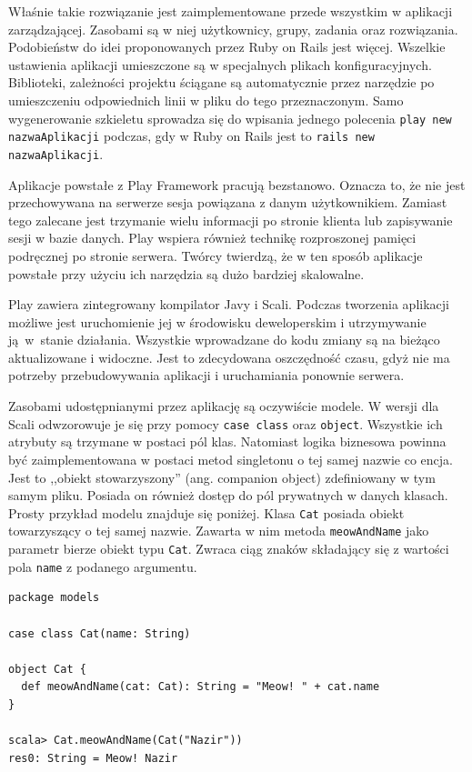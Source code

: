 \documentclass[wimgr]{xmgr}
\begin{document}
Właśnie takie rozwiązanie jest zaimplementowane przede wszystkim w aplikacji zarządzającej. Zasobami są w niej użytkownicy, grupy, zadania oraz rozwiązania. Podobieństw do idei proponowanych przez Ruby on Rails jest więcej. Wszelkie ustawienia aplikacji umieszczone są w specjalnych plikach konfiguracyjnych. Biblioteki, zależności projektu ściągane są automatycznie przez narzędzie po umieszczeniu odpowiednich linii w pliku do tego przeznaczonym. Samo wygenerowanie szkieletu sprowadza się do wpisania jednego polecenia \texttt{play new nazwaAplikacji} podczas, gdy w Ruby on Rails jest to \texttt{rails new nazwaAplikacji}.

Aplikacje powstałe z Play Framework pracują bezstanowo. Oznacza to, że nie jest przechowywana na serwerze sesja powiązana z danym użytkownikiem. Zamiast tego zalecane jest trzymanie wielu informacji po stronie klienta lub zapisywanie sesji w bazie danych. Play wspiera również technikę rozproszonej pamięci podręcznej po stronie serwera. Twórcy twierdzą, że w ten sposób aplikacje powstałe przy użyciu ich narzędzia są dużo bardziej skalowalne.

Play zawiera zintegrowany kompilator Javy i Scali. Podczas tworzenia aplikacji możliwe jest uruchomienie jej w środowisku deweloperskim i utrzymywanie ją~w~stanie działania. Wszystkie wprowadzane do kodu zmiany są na bieżąco aktualizowane i widoczne. Jest to zdecydowana oszczędność czasu, gdyż nie ma potrzeby przebudowywania aplikacji i uruchamiania ponownie serwera. 

Zasobami udostępnianymi przez aplikację są oczywiście modele. W wersji dla Scali odwzorowuje je się przy pomocy \texttt{case class} oraz \texttt{object}. Wszystkie ich atrybuty są trzymane w postaci pól klas. Natomiast logika biznesowa powinna być zaimplementowana w postaci metod singletonu o tej samej nazwie co encja. Jest to ,,obiekt stowarzyszony'' (ang. companion object) zdefiniowany w tym samym pliku. Posiada on również dostęp do pól prywatnych w danych klasach. Prosty przykład modelu znajduje się poniżej. Klasa \texttt{Cat} posiada obiekt towarzyszący o tej samej nazwie. Zawarta w nim metoda \texttt{meowAndName} jako parametr bierze obiekt typu \texttt{Cat}. Zwraca ciąg znaków składający się z wartości pola \texttt{name} z podanego argumentu.

\begin{verbatim}
package models

case class Cat(name: String)

object Cat {
  def meowAndName(cat: Cat): String = "Meow! " + cat.name
}

scala> Cat.meowAndName(Cat("Nazir"))
res0: String = Meow! Nazir
\end{verbatim}
\end{document}
